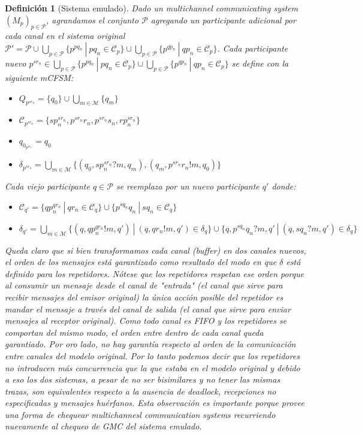 \documentclass[paper=a4, fontsize=11pt, spanish]{scrartcl} %
\numberwithin{equation}{section} %
\numberwithin{figure}{section} %
\numberwithin{table}{section} %
\newtheorem{definition}{Definición}
\begin{document}
\begin{definition}[Sistema emulado] Dado un multichannel communicating system $(M_p)_{p \in \mathcal{P}}$, agrandamos el conjunto $ \mathcal{P}$ agregando un participante adicional por cada canal en el sistema original $\mathcal{P}'=\mathcal{P} \cup \bigcup_{p \in \mathcal{P}} \{p^{pq_n} \ | \ pq_n \in \mathcal{C}_p \} \cup \bigcup_{p \in \mathcal{P}} \{p^{qp_n} \ | \ qp_n \in \mathcal{C}_p \}$. Cada participante nuevo $p^{sr_n} \in \bigcup_{p \in \mathcal{P}} \{p^{pq_n} \ | \ pq_n \in \mathcal{C}_p \} \cup \bigcup_{p \in \mathcal{P}} \{p^{qp_n} \ | \ qp_n \in \mathcal{C}_p \}$ se define con la siguiente mCFSM:
\begin{itemize}
\item $Q_{p^{sr_n}} = \{q_0\} \cup \bigcup_{m \in \mathcal{M}} \{q_m\}$
\item $\mathcal{C}_{p^{sr_n}} = \{sp_n^{sr_n}, p^{sr_n}r_n,  p^{sr_n}s_n, rp_n^{sr_n} \}$
\item $q_{0_{p^{sr_n}}} = q_0 $
\item $ \delta_{p^{sr_n}} = \bigcup_{m \in \mathcal{M}} \{ (q_0,sp_n^{sr_n}?m,q_m),(q_m,p^{sr_n}r_n!m,q_0)  \} $
\end{itemize}
Cada viejo participante $q \in \mathcal{P}$ se reemplaza por un nuevo participante $q'$ donde:
\begin{itemize}
\item $\mathcal{C}_{q'} = \{qp_n^{qr_n} \ | \ qr_n \in \mathcal{C}_{q} \} \cup \{p^{sq_n}q_n \ | \ sq_n \in \mathcal{C}_{q} \}$ 
\item $ \delta_{q'} = \bigcup_{m \in \mathcal{M}} \{ (q, qp_n^{qr_n}!m, q') \ | \ (q, qr_n!m, q') \in \delta_q \} \cup \{q, p^{sq_n}q_n?m,q' \ | \ (q, sq_n?m, q') \in \delta_q \}$

\end{itemize}

Queda claro que si bien transformamos cada canal (buffer) en dos canales nuevos, el orden de los mensajes está garantizado como resultado del modo en que $\delta$ está definido para los repetidores. Nótese que los repetidores respetan ese orden porque al consumir un mensaje desde el canal de "entrada" (el canal que sirve para recibir mensajes del emisor original) la única acción posible del repetidor es mandar el mensaje a través del canal de salida (el canal que sirve para enviar mensajes al receptor original). Como todo canal es FIFO y los repetidores se comportan del mismo modo, el orden entre dentro de cada canal queda garantiado. Por oro lado, no hay garantía respecto al orden de la comunicación entre canales del modelo original. Por lo tanto podemos decir que los repetidores no introducen más concurrencia que la que estaba en el modelo original y debido a eso los dos sistemas, a pesar de no ser bisimilares y no tener las mismas trazas, son equivalentes respecto a la ausencia de deadlock, recepciones no especificadas y mensajes huérfanos. Esta observación es importante porque provee una forma de chequear multichannesl communication systems recurriendo nuevamente al chequeo de GMC del sistema emulado.

\end{definition} 
\end{document}
